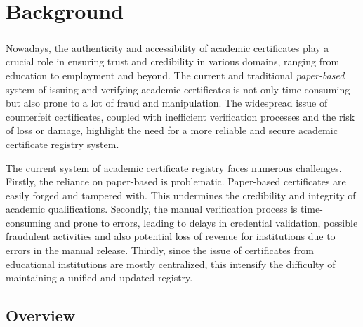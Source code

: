 %
%
\chapter{Background}\label{chap:background}
\paragraph{}

Nowadays, the authenticity and accessibility of academic certificates play a crucial role in ensuring trust and credibility in various
domains, ranging from education to employment and beyond.
The current and traditional \textit{paper-based} system of issuing and verifying academic certificates is not only time consuming but also prone to a lot of fraud and manipulation.
The widespread issue of counterfeit certificates\cite{certCounterfeitAdv, certCounterfeitRid, Rodrigues_2023}, coupled with inefficient verification processes and the risk of loss or damage, highlight the need for a more reliable and secure academic certificate registry system.

The current system of academic certificate registry faces numerous challenges. Firstly, the reliance on paper-based is problematic. Paper-based certificates are easily forged and tampered with. This undermines the credibility and integrity of academic qualifications. Secondly, the manual verification process is
time-consuming and prone to errors, leading to delays in credential validation, possible fraudulent activities and also potential loss of revenue for institutions due to
errors in the manual release. Thirdly, since the issue of certificates from educational institutions are mostly centralized, this intensify the difficulty
of maintaining a unified and updated registry.

\section{Overview}\label{sec:overview}
\paragraph{}

